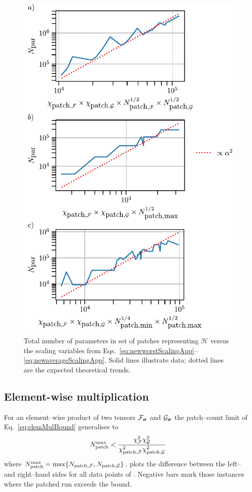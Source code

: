 \begin{figure}[htpb]
    \centering
    \includegraphics{figures/patchedMulMemoryScaling.pdf}
    \caption{Total number of parameters in set of patches representing \(\mathcal H\) versus the scaling variables from Eqs.~\eqref{eq:newworstScalingApp}–
           \eqref{eq:newaverageScalingApp}.  Solid lines illustrate data; dotted lines are the expected
           theoretical trends.}
    \label{fig:patchedMulMemoryScaling}
\end{figure}


\subsection{Element-wise multiplication}
For an element–wise product of two tensors
\(\mathcal{F}_{\boldsymbol{\sigma}}\) and \(\mathcal{G}_{\boldsymbol{\sigma}}\) the patch–count limit of Eq.~\eqref{eq:elemMulBound} generalises to
\begin{equation}
          N_{\text{patch}}^{\text{max}}
    <\frac{\chi^2_{\mathcal{F}}\chi^2_{\mathcal{G}}}{\chi^2_{\text{patch},\mathcal{F}}\chi^2_{\text{patch},\mathcal{G}}} 
            \label{eq:newElemBoundApp}
        \end{equation}
where $N_{\text{patch}}^{\text{max}} = \max \{N_{\text{patch},\mathcal{F}},N_{\text{patch},\mathcal{G}}\}$.  plots the difference between the left– and right–hand sides for all data points of .  
Negative bars mark those instances where the patched run exceeds the bound.

